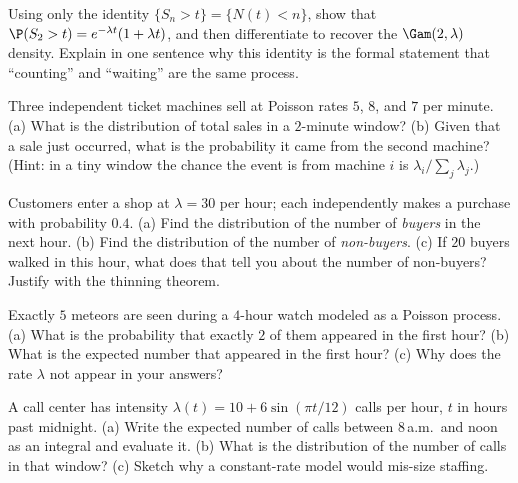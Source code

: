 \begin{exercise}
\label{ch25:exr-bridge}
Using only the identity $\{S_n > t\} = \{N(t) < n\}$, show that
$\P(S_2 > t) = e^{-\lambda t}(1+\lambda t)$, and then differentiate to recover
the $\Gam(2,\lambda)$ density. Explain in one sentence why this identity is the
formal statement that ``counting'' and ``waiting'' are the same process.
\end{exercise}

\begin{exercise}
\label{ch25:exr-super}
Three independent ticket machines sell at Poisson rates $5$, $8$, and $7$ per
minute. (a) What is the distribution of total sales in a $2$-minute window? (b)
Given that a sale just occurred, what is the probability it came from the second
machine? (Hint: in a tiny window the chance the event is from machine $i$ is
$\lambda_i/\sum_j\lambda_j$.)
\end{exercise}

\begin{exercise}
\label{ch25:exr-thin}
Customers enter a shop at $\lambda = 30$ per hour; each independently makes a
purchase with probability $0.4$. (a) Find the distribution of the number of
\emph{buyers} in the next hour. (b) Find the distribution of the number of
\emph{non-buyers}. (c) If $20$ buyers walked in this hour, what does that tell you
about the number of non-buyers? Justify with the thinning theorem.
\end{exercise}

\begin{exercise}
\label{ch25:exr-uniform}
Exactly $5$ meteors are seen during a $4$-hour watch modeled as a Poisson
process. (a) What is the probability that exactly $2$ of them appeared in the
first hour? (b) What is the expected number that appeared in the first hour? (c)
Why does the rate $\lambda$ not appear in your answers?
\end{exercise}

\begin{exercise}
\label{ch25:exr-nonhomog}
A call center has intensity $\lambda(t) = 10 + 6\sin(\pi t/12)$ calls per hour,
$t$ in hours past midnight. (a) Write the expected number of calls between
$8$\,a.m.\ and noon as an integral and evaluate it. (b) What is the distribution
of the number of calls in that window? (c) Sketch why a constant-rate model would
mis-size staffing.
\end{exercise}

